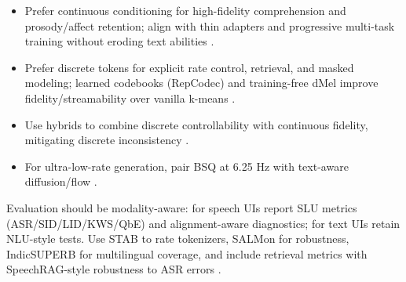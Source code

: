 \documentclass{article}
\begin{document}
\begin{itemize}
  \item Prefer continuous conditioning for high-fidelity comprehension and prosody/affect retention; align with thin adapters and progressive multi-task training without eroding text abilities \cite{li2025continuousspeechtokenizertext,wang2023slmbridgethingapbetweenspeechtextfoundat}.
  \item Prefer discrete tokens for explicit rate control, retrieval, and masked modeling; learned codebooks (RepCodec) and training-free dMel improve fidelity/streamability over vanilla k-means \cite{huang2024repcodecspeechrepresentationcodectokeniz,bai2025dmelspeechtokenizationmadesimple}.
  \item Use hybrids to combine discrete controllability with continuous fidelity, mitigating discrete inconsistency \cite{guo2025recentadvancesdiscretespeechtokensreview,liu2024analyzingmitigatinginconsistencydiscrete}.
  \item For ultra-low-rate generation, pair BSQ at 6.25 Hz with text-aware diffusion/flow \cite{wang2025tadicodectextawarediffusionspeechtokeniz}.
\end{itemize}

Evaluation should be modality-aware: for speech UIs report SLU metrics (ASR/SID/LID/KWS/QbE) and alignment-aware diagnostics; for text UIs retain NLU-style tests. Use STAB to rate tokenizers, SALMon for robustness, IndicSUPERB for multilingual coverage, and include retrieval metrics with SpeechRAG-style robustness to ASR errors \cite{tan2025ssralignmentawaremodalityconnectorspeech,vashishth2024stabspeechtokenizerassessmentbenchmark,maimon2025salmonsuiteacousticlanguagemodelevaluati,entry2025indicsuperbspeechprocessinguniversalperf,min2025speechretrievalaugmentedgenerationwithou}.
\end{document}
